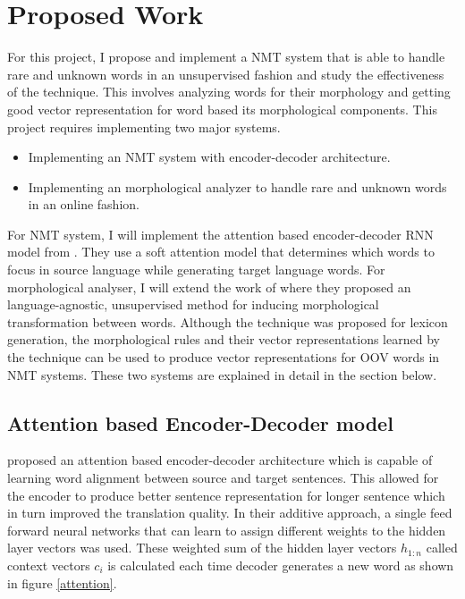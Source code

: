 \section{Proposed Work }
For this project, I propose and implement a NMT system that is able to handle rare and unknown words in an unsupervised fashion and study the effectiveness of the technique. This involves analyzing words for their morphology and getting good vector representation for word based its morphological components. This project requires implementing two major systems.

\begin{itemize}
	\item Implementing an NMT system with encoder-decoder architecture.
	\item Implementing an morphological analyzer to handle rare and unknown words in an online fashion.
\end{itemize}


For NMT system, I will implement the attention based encoder-decoder RNN model from \cite{bahdanau2014neural}. They use a soft attention model that determines which words to focus in source language while generating target language words. For morphological analyser, I will extend the work of \cite{soricut2015unsupervised} where they proposed an language-agnostic, unsupervised method for inducing morphological transformation between words. Although the technique was proposed for lexicon generation, the morphological rules and their vector representations learned by the technique can be used to produce vector representations for OOV words in NMT systems. These two systems are explained in detail in the section below.




\subsection{Attention based Encoder-Decoder model \citep{bahdanau2014neural}}

\cite{bahdanau2014neural} proposed an attention based encoder-decoder architecture which is capable of learning word alignment between source and target sentences. This allowed for the encoder to produce better sentence representation for longer sentence which in turn improved the translation quality. In their additive approach, a single feed forward neural networks that can learn to assign different weights to the hidden layer vectors was used. These weighted sum of the hidden layer vectors $h_{1:n}$ called context vectors $c_i$ is calculated each time decoder generates a new word as shown in figure \ref{attention}.


